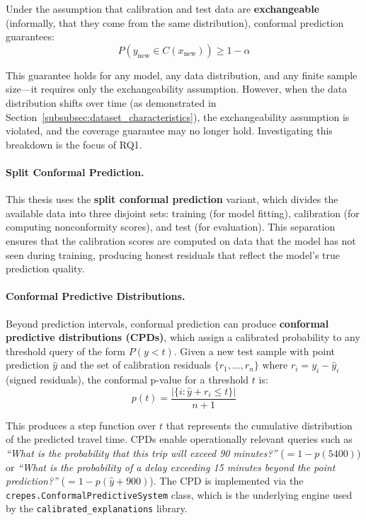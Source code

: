 Under the assumption that calibration and test data are \textbf{exchangeable} (informally, that they come from the same distribution), conformal prediction guarantees:
\begin{equation}
    P\!\left(y_{\text{new}} \in C(x_{\text{new}})\right) \geq 1 - \alpha
    \label{eq:coverage_guarantee}
\end{equation}

This guarantee holds for any model, any data distribution, and any finite sample size—it requires only the exchangeability assumption. However, when the data distribution shifts over time (as demonstrated in Section~\ref{subsubsec:dataset_characteristics}), the exchangeability assumption is violated, and the coverage guarantee may no longer hold. Investigating this breakdown is the focus of RQ1.

\paragraph{Split Conformal Prediction.}
This thesis uses the \textbf{split conformal prediction} variant, which divides the available data into three disjoint sets: training (for model fitting), calibration (for computing nonconformity scores), and test (for evaluation). This separation ensures that the calibration scores are computed on data that the model has not seen during training, producing honest residuals that reflect the model's true prediction quality.

\paragraph{Conformal Predictive Distributions.}
Beyond prediction intervals, conformal prediction can produce \textbf{conformal predictive distributions (CPDs)}, which assign a calibrated probability to any threshold query of the form $P(y < t)$. Given a new test sample with point prediction $\hat{y}$ and the set of calibration residuals $\{r_1, \ldots, r_n\}$ where $r_i = y_i - \hat{y}_i$ (signed residuals), the conformal p-value for a threshold $t$ is:
\begin{equation}
    p(t) = \frac{|\{i : \hat{y} + r_i \leq t\}|}{n + 1}
    \label{eq:cpd}
\end{equation}

This produces a step function over $t$ that represents the cumulative distribution of the predicted travel time. CPDs enable operationally relevant queries such as \emph{``What is the probability that this trip will exceed 90 minutes?''} ($= 1 - p(5400)$) or \emph{``What is the probability of a delay exceeding 15 minutes beyond the point prediction?''} ($= 1 - p(\hat{y} + 900)$). The CPD is implemented via the \texttt{crepes.ConformalPredictiveSystem} class, which is the underlying engine used by the \texttt{calibrated\_explanations} library.

